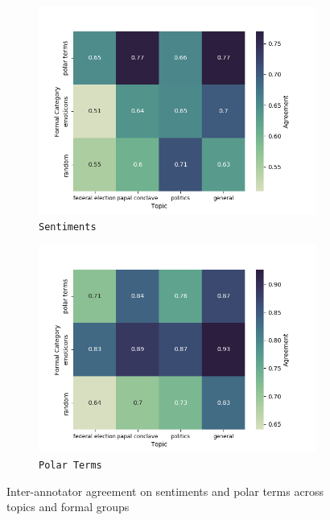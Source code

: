 \begin{figure}[htbp!]
{
\centering
\begin{subfigure}{.5\textwidth}
  \centering
  \includegraphics[width=\linewidth]{img/sentiment_agreement.png}
  \caption{\texttt{Sentiments}}
\end{subfigure}%
\begin{subfigure}{.5\textwidth}
  \centering
  \includegraphics[width=\linewidth]{img/emo-expression_agreement.png}
  \caption{\texttt{Polar Terms}}
\end{subfigure}
}
\caption{Inter-annotator agreement on sentiments and polar terms
  across topics and formal groups}\label{snt:fig:crp-sent-emo-agr}
\end{figure}

